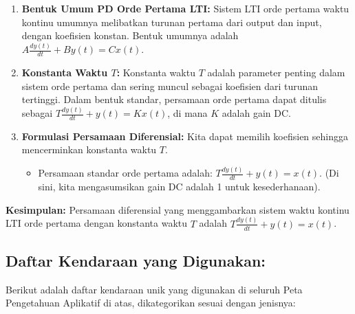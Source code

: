 \documentclass[
  letterpaper,
  DIV=11,
  numbers=noendperiod]{scrreprt}
\providecommand{\tightlist}{%
  \setlength{\itemsep}{0pt}\setlength{\parskip}{0pt}}
\begin{document}
\begin{enumerate}
\def\labelenumi{\arabic{enumi}.}
\tightlist
\item
  \textbf{Bentuk Umum PD Orde Pertama LTI:} Sistem LTI orde pertama
  waktu kontinu umumnya melibatkan turunan pertama dari output dan
  input, dengan koefisien konstan. Bentuk umumnya adalah
  \(A \frac{dy(t)}{dt} + B y(t) = C x(t)\).
\item
  \textbf{Konstanta Waktu \(T\):} Konstanta waktu \(T\) adalah parameter
  penting dalam sistem orde pertama dan sering muncul sebagai koefisien
  dari turunan tertinggi. Dalam bentuk standar, persamaan orde pertama
  dapat ditulis sebagai \(T \frac{dy(t)}{dt} + y(t) = K x(t)\), di mana
  \(K\) adalah gain DC.
\item
  \textbf{Formulasi Persamaan Diferensial:} Kita dapat memilih koefisien
  sehingga mencerminkan konstanta waktu \(T\).

  \begin{itemize}
  \tightlist
  \item
    Persamaan standar orde pertama adalah:
    \(T \frac{dy(t)}{dt} + y(t) = x(t)\). (Di sini, kita mengasumsikan
    gain DC adalah 1 untuk kesederhanaan).
  \end{itemize}
\end{enumerate}

\textbf{Kesimpulan:} Persamaan diferensial yang menggambarkan sistem
waktu kontinu LTI orde pertama dengan konstanta waktu \(T\) adalah
\textbf{\(T \frac{dy(t)}{dt} + y(t) = x(t)\)}.

\subsection{Daftar Kendaraan yang
Digunakan:}\label{daftar-kendaraan-yang-digunakan}

Berikut adalah daftar kendaraan unik yang digunakan di seluruh Peta
Pengetahuan Aplikatif di atas, dikategorikan sesuai dengan jenisnya:
\end{document}

